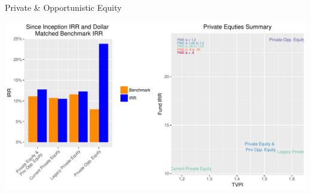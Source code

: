 \documentclass[10pt,english]{beamer}\usepackage[]{graphicx}\usepackage[]{color}
\makeatletter
\def\maxwidth{ %
  \ifdim\Gin@nat@width>\linewidth
    \linewidth
  \else
    \Gin@nat@width
  \fi
}
\newenvironment{knitrout}{}{} %
\makeatother
\begin{document}
\begin{frame}[fragile]{Private \& Opportunistic Equity}

\begin{knitrout}
\color{fgcolor}
\includegraphics[width=\maxwidth]{figure/eq_privates-1} 

\end{knitrout}
\end{frame}
%
\end{document}
